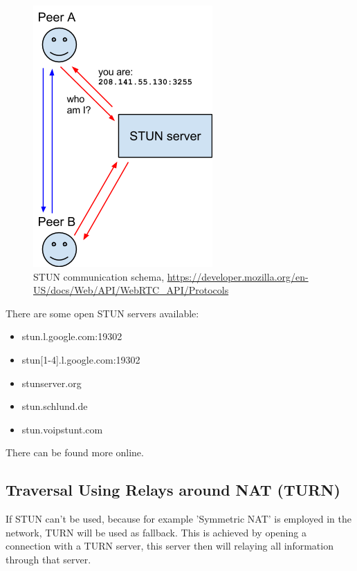 \begin{figure}[H]
	\includegraphics[scale=0.5]{images/webrtc-stun.png}
	\centering
	\caption{STUN communication schema, \url{https://developer.mozilla.org/en-US/docs/Web/API/WebRTC_API/Protocols}}
	\label{fig:STUN}
\end{figure}

There are some open STUN servers available:
\begin{itemize}
	\item stun.l.google.com:19302
	\item stun[1-4].l.google.com:19302
	\item stunserver.org
	\item stun.schlund.de
	\item stun.voipstunt.com
\end{itemize}

There can be found more online.

\subsection{Traversal Using Relays around NAT (TURN)}
If STUN can't be used, because for example 'Symmetric NAT' is employed in the network, TURN will be used as fallback. This is achieved by opening a connection with a TURN server, this server then will relaying all information through that server.

